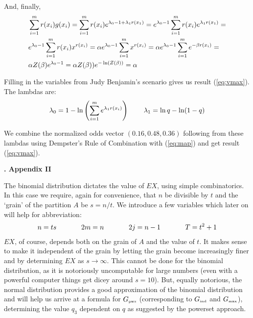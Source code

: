 \documentclass[12pt]{article}
\newcommand{\kapt}[1]{\noindent \textbf{{\thechap}. #1}\addtocounter{chap}{1}}
\newcommand{\qnull}[1]{`#1'}
\newcommand{\nias}{\noindent} %
\begin{document}
And, finally,
\begin{align}
&\sum_{i=1}^{m}r(x_{i})g(x_{i})=\sum_{i=1}^{m}r(x_{i})e^{\lambda_{0}-1+\lambda_{1}r(x_{1})}=e^{\lambda_{0}-1}\sum_{i=1}^{m}r(x_{i})e^{\lambda_{1}r(x_{1})}=\notag\\
&e^{\lambda_{0}-1}\sum_{i=1}^{m}r(x_{i})x^{r(x_{i})}=\alpha{}e^{\lambda_{0}-1}\sum_{i=1}^{m}x^{r(x_{i})}=\alpha{}e^{\lambda_{0}-1}\sum_{i=1}^{m}e^{-\beta{}r(x_{i})}=\notag\\
&\alpha{}Z(\beta)e^{\lambda_{0}-1}=\alpha{}Z(\beta))e^{-\ln(Z(\beta))}=\alpha\notag
\end{align}

Filling in the variables from Judy Benjamin's scenario gives us result
({\ref{eq:vmax}}). The lambdas are:
  \begin{displaymath}
    \lambda_{0}=1-\ln\left(\sum_{i=1}^{m}e^{\lambda_{1}r(x_{i})}\right)\hspace{.3in}
    \lambda_{1}=\ln{}q-\ln(1-q)\notag
  \end{displaymath}

  We combine the normalized odds vector $(0.16,0.48,0.36)$ following
  from these lambdas using Dempster's Rule of Combination with
  ({\ref{eq:map}}) and get result ({\ref{eq:vmax}}).

\medskip

\kapt{Appendix II}

\nias The binomial distribution dictates the value of $EX$, using
simple combinatorics. In this case we require, again for convenience,
that $n$ be divisible by $t$ and the \qnull{grain} of the partition
$A$ be $s=n/t$. We introduce a few variables which later on will help
for abbreviation:
\begin{displaymath}
n=ts\hspace{.5in}
2m=n\hspace{.5in}
2j=n-1\hspace{.5in}
{T}=t^{2}+1
\end{displaymath}
$EX$, of course, depends both on the grain of $A$ and the value of
$t$. It makes sense to make it independent of the grain by letting the
grain become increasingly finer and by determining $EX$ as
$s\rightarrow\infty$. This cannot be done for the binomial
distribution, as it is notoriously uncomputable for large numbers
(even with a powerful computer things get dicey around $s=10$). But,
equally notorious, the normal distribution provides a good
approximation of the binomial distribution and will help us arrive at
a formula for $G_{\mbox{\tiny pws}}$ (corresponding to 
$G_{\mbox{\tiny ind}}$ and $G_{\mbox{\tiny max}}$), determining the value $q_{3}$
dependent on $q$ as suggested by the powerset approach.
\end{document}
